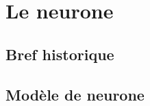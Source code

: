 \def\xxfigures{
}%

\iflivret

\else

\fi
\setlength{\columnseprule}{.1pt}

\vspace{2cm}
\pagestyle{fancy}
\thispagestyle{plain}



\section{Le neurone}

\subsection{Bref historique}

\subsection{Modèle de neurone}

